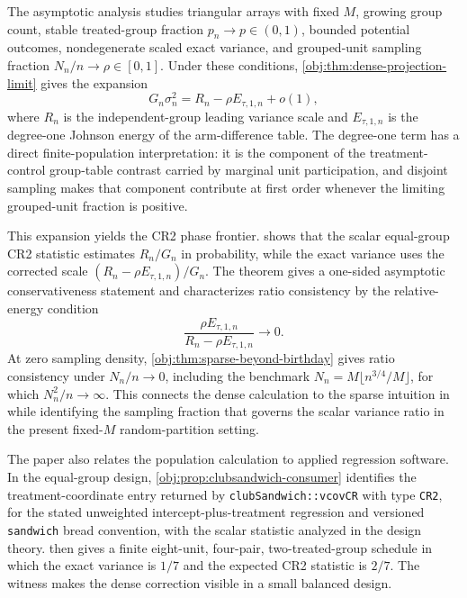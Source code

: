 The asymptotic analysis studies triangular arrays with fixed \(M\), growing group count, stable treated-group fraction \(p_n\to p\in(0,1)\), bounded potential outcomes, nondegenerate scaled exact variance, and grouped-unit sampling fraction \(N_n/n\to\rho\in[0,1]\). Under these conditions, \cref{obj:thm:dense-projection-limit} gives the expansion
\[
G_n\sigma_n^2=R_n-\rho E_{\tau,1,n}+o(1),
\]
where \(R_n\) is the independent-group leading variance scale and \(E_{\tau,1,n}\) is the degree-one Johnson energy of the arm-difference table. The degree-one term has a direct finite-population interpretation: it is the component of the treatment-control group-table contrast carried by marginal unit participation, and disjoint sampling makes that component contribute at first order whenever the limiting grouped-unit fraction is positive.

This expansion yields the CR2 phase frontier.  shows that the scalar equal-group CR2 statistic estimates \(R_n/G_n\) in probability, while the exact variance uses the corrected scale \((R_n-\rho E_{\tau,1,n})/G_n\). The theorem gives a one-sided asymptotic conservativeness statement and characterizes ratio consistency by the relative-energy condition
\[
\frac{\rho E_{\tau,1,n}}{R_n-\rho E_{\tau,1,n}}\to0.
\]
At zero sampling density, \cref{obj:thm:sparse-beyond-birthday} gives ratio consistency under \(N_n/n\to0\), including the benchmark \(N_n=M\lfloor n^{3/4}/M\rfloor\), for which \(N_n^2/n\to\infty\). This connects the dense calculation to the sparse intuition in \citet{FuSamiiWang2026} while identifying the sampling fraction that governs the scalar variance ratio in the present fixed-\(M\) random-partition setting.

The paper also relates the population calculation to applied regression software. In the equal-group design, \cref{obj:prop:clubsandwich-consumer} identifies the treatment-coordinate entry returned by \texttt{clubSandwich::vcovCR} with type \texttt{CR2}, for the stated unweighted intercept-plus-treatment regression and versioned \texttt{sandwich} bread convention, with the scalar statistic analyzed in the design theory.  then gives a finite eight-unit, four-pair, two-treated-group schedule in which the exact variance is \(1/7\) and the expected CR2 statistic is \(2/7\). The witness makes the dense correction visible in a small balanced design.

